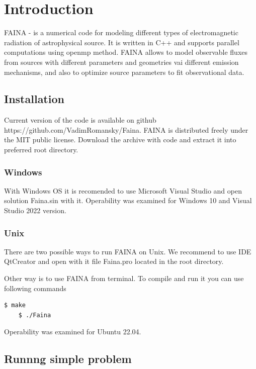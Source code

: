 \chapter*{Introduction}		
FAINA - is a numerical code for modeling different types of electromagnetic radiation of astrophysical source. It is written in C++ and supports parallel computations using openmp method. FAINA allows to model observable fluxes from sources with different parameters and geometries vai different emission mechanisms, and also to optimize source parameters to fit observational data.

\section*{Installation}
Current version of the code is available on github https://github.com/VadimRomansky/Faina. FAINA is distributed freely under the MIT public license. Download the archive with code and extract it into preferred root directory.

\subsection*{Windows}
With Windows OS it is recomended to use Microsoft Visual Studio and open solution Faina.sin with it. Operability was examined for Windows 10 and Visual Studio 2022 version.

\subsection*{Unix}
There are two possible ways to run FAINA on Unix. We recommend to use IDE QtCreator and open  with it file Faina.pro located in the root directory.

Other way is to use FAINA from terminal. To compile and run it you can use following commands

\begin{lstlisting}[language=bash]
	$ make
	$ ./Faina
\end{lstlisting}

Operability was examined for Ubuntu 22.04.

\section*{Runnng simple problem}\label{running}

